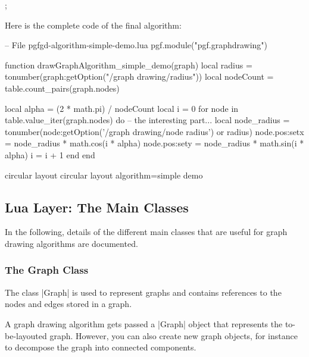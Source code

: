 \begin{codeexample}[]
\tikz {};
\end{codeexample}

Here is the complete code of the final algorithm:
\begin{codeexample}
-- File pgfgd-algorithm-simple-demo.lua
pgf.module("pgf.graphdrawing")

function drawGraphAlgorithm_simple_demo(graph)
   local radius = tonumber(graph:getOption("/graph drawing/radius"))
   local nodeCount = table.count_pairs(graph.nodes)

   local alpha = (2 * math.pi) / nodeCount
   local i = 0
   for node in table.value_iter(graph.nodes) do
      -- the interesting part...
      local node_radius = tonumber(node:getOption('/graph drawing/node radius') or radius)
      node.pos:set{x = node_radius * math.cos(i * alpha)}
      node.pos:set{y = node_radius * math.sin(i * alpha)}
      i = i + 1
   end
end  
\end{codeexample}

\begin{codeexample}
  
\pgfgddeclarealgorithmkey
  {circular layout}
  {circular layout}
  {algorithm=simple demo}

\end{codeexample}



\subsection{Lua Layer: The Main Classes}

In the following, details of the different main classes that are
useful for graph drawing algorithms are documented.


\subsubsection{The Graph Class}

The class |Graph| is used to represent graphs and contains
references to the nodes and edges stored in a graph.

A graph drawing algorithm gets passed a |Graph| object that represents
the to-be-layouted graph. However, you can also create new graph
objects, for instance to decompose the graph into connected
components. 

